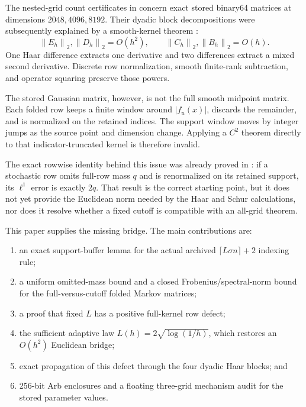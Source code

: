\documentclass[11pt]{article}
\theoremstyle{definition}
\theoremstyle{remark}
\newcommand{\norm}[1]{\left\lVert #1\right\rVert}
\begin{document}
The nested-grid count certificates in
\citet{WangNested2026,WangIterated2026} concern exact stored binary64
matrices at dimensions $2048,4096,8192$.  Their dyadic block decompositions
were subsequently explained by a smooth-kernel theorem
\citep{WangHaar2026}:
\[
\norm{E_h}_2,\norm{D_h}_2=O(h^2),\qquad
\norm{C_h}_2,\norm{B_h}_2=O(h).
\]
One Haar difference extracts one derivative and two differences extract a
mixed second derivative.  Discrete row normalization, smooth finite-rank
subtraction, and operator squaring preserve those powers.

The stored Gaussian matrix, however, is not the full smooth midpoint matrix.
Each folded row keeps a finite window around $|f_u(x)|$, discards the
remainder, and is normalized on the retained indices.  The support window
moves by integer jumps as the source point and dimension change.  Applying a
$C^2$ theorem directly to that indicator-truncated kernel is therefore
invalid.

The exact rowwise identity behind this issue was already proved in
\citet{WangResponse2026}: if a stochastic row omits full-row mass $q$ and is
renormalized on its retained support, its $\ell^1$ error is exactly $2q$.
That result is the correct starting point, but it does not yet provide the
Euclidean norm needed by the Haar and Schur calculations, nor does it resolve
whether a fixed cutoff is compatible with an all-grid theorem.

This paper supplies the missing bridge.  The main contributions are:

\begin{enumerate}[leftmargin=2em]
 \item an exact support-buffer lemma for the actual archived
       $\lceil L\sigma n\rceil+2$ indexing rule;
 \item a uniform omitted-mass bound and a closed Frobenius/spectral-norm
       bound for the full-versus-cutoff folded Markov matrices;
 \item a proof that fixed $L$ has a positive full-kernel row defect;
 \item the sufficient adaptive law
       $L(h)=2\sqrt{\log(1/h)}$, which restores an $O(h^2)$ Euclidean bridge;
 \item exact propagation of this defect through the four dyadic Haar blocks;
       and
 \item 256-bit Arb enclosures and a floating three-grid mechanism audit for
       the stored parameter values.
\end{enumerate}
\end{document}
